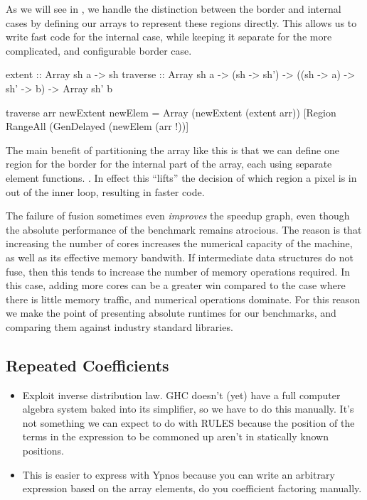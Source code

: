 As we will see in \REF, we handle the distinction between the border and internal cases by defining our arrays to represent these regions directly. This allows us to write fast code for the internal case, while keeping it separate for the more complicated, and configurable border case.

extent    :: Array sh a -> sh
traverse  :: Array sh a
          -> (sh  -> sh') -> ((sh -> a) -> sh' -> b)
          -> Array sh' b
	
traverse arr newExtent newElem
 = Array (newExtent (extent arr))
         [Region RangeAll (GenDelayed (newElem (arr !))]

The main benefit of partitioning the array like this is that we can define one region for the border for the internal part of the array, each using separate element functions. . In effect this ``lifts'' the decision of which region a pixel is in out of the inner loop, resulting in faster code. 



The failure of fusion sometimes even \emph{improves} the speedup graph, even though the absolute performance of the benchmark remains atrocious. The reason is that increasing the number of cores increases the numerical capacity of the machine, as well as its effective memory bandwith. If intermediate data structures do not fuse, then this tends to increase the number of memory operations required. In this case, adding more cores can be a greater win compared to the case where there is little memory traffic, and numerical operations dominate. For this reason we make the point of presenting absolute runtimes for our benchmarks, and comparing them against industry standard libraries. 


\subsection{Repeated Coefficients}

\begin{itemize}
\item 	Exploit inverse distribution law. GHC doesn't (yet) have a full computer algebra system baked into its simplifier, so we have to do this manually. It's not something we can expect to do with RULES because the position of the terms in the expression to be commoned up aren't in statically known positions.

\item	This is easier to express with Ypnos because you can write an arbitrary expression based on the array elements, do you coefficient factoring manually. 
\end{itemize}


